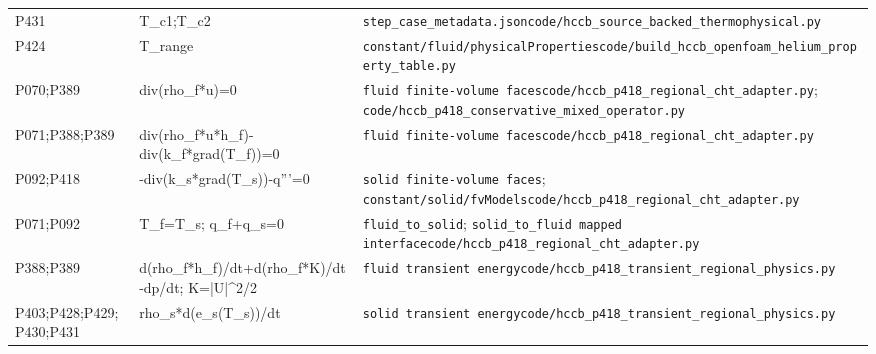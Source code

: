 \begin{longtable}{>{\raggedright\arraybackslash}p{2.0cm}>{\raggedright\arraybackslash}p{4.0cm}>{\raggedright\arraybackslash}p{12.2cm}}
P431 & T\_\allowbreak{}c1;\allowbreak{}T\_\allowbreak{}c2 & \nolinkurl{step_case_metadata.json}\newline \nolinkurl{code/hccb_source_backed_thermophysical.py} \\
P424 & T\_\allowbreak{}range & \nolinkurl{constant/fluid/physicalProperties}\newline \nolinkurl{code/build_hccb_openfoam_helium_property_table.py} \\
P070;\allowbreak{}P389 & div(\allowbreak{}rho\_\allowbreak{}f*u)=\allowbreak{}0 & \nolinkurl{fluid finite-volume faces}\newline \nolinkurl{code/hccb_p418_regional_cht_adapter.py}; \nolinkurl{code/hccb_p418_conservative_mixed_operator.py} \\
P071;\allowbreak{}P388;\allowbreak{}P389 & div(\allowbreak{}rho\_\allowbreak{}f*u*h\_\allowbreak{}f)-div(\allowbreak{}k\_\allowbreak{}f*grad(\allowbreak{}T\_\allowbreak{}f))=\allowbreak{}0 & \nolinkurl{fluid finite-volume faces}\newline \nolinkurl{code/hccb_p418_regional_cht_adapter.py} \\
P092;\allowbreak{}P418 & -div(\allowbreak{}k\_\allowbreak{}s*grad(\allowbreak{}T\_\allowbreak{}s))-q'''=\allowbreak{}0 & \nolinkurl{solid finite-volume faces}; \nolinkurl{constant/solid/fvModels}\newline \nolinkurl{code/hccb_p418_regional_cht_adapter.py} \\
P071;\allowbreak{}P092 & T\_\allowbreak{}f=\allowbreak{}T\_\allowbreak{}s;\allowbreak{} q\_\allowbreak{}f+q\_\allowbreak{}s=\allowbreak{}0 & \nolinkurl{fluid_to_solid}; \nolinkurl{solid_to_fluid mapped interface}\newline \nolinkurl{code/hccb_p418_regional_cht_adapter.py} \\
P388;\allowbreak{}P389 & d(\allowbreak{}rho\_\allowbreak{}f*h\_\allowbreak{}f)/\allowbreak{}dt+d(\allowbreak{}rho\_\allowbreak{}f*K)/\allowbreak{}dt-dp/\allowbreak{}dt;\allowbreak{} K=\allowbreak{}|U|\textasciicircum{}2/\allowbreak{}2 & \nolinkurl{fluid transient energy}\newline \nolinkurl{code/hccb_p418_transient_regional_physics.py} \\
P403;\allowbreak{}P428;\allowbreak{}P429;\allowbreak{}P430;\allowbreak{}P431 & rho\_\allowbreak{}s*d(\allowbreak{}e\_\allowbreak{}s(\allowbreak{}T\_\allowbreak{}s))/\allowbreak{}dt & \nolinkurl{solid transient energy}\newline \nolinkurl{code/hccb_p418_transient_regional_physics.py} \\

\end{longtable}
